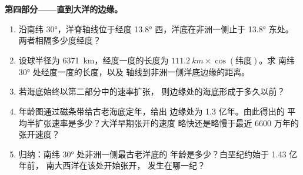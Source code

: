 \begin{problem}
\medskip
\noindent\textbf{第四部分——直到大洋的边缘。}
\begin{enumerate}[resume]
  \item 沿南纬 \ang{30}，洋脊轴线位于经度
        \ang{13.8} 西，洋底在非洲一侧止于
        \ang{13.8} 东处。两者相隔多少度经度？
  \item 设球半径为 \qty{6371}{km}，经度一度的长度为
        $\qty{111.2}{km} \times \cos(\text{纬度})$。求
        南纬 \ang{30} 处经度一度的长度，以及
        轴线到非洲一侧洋底边缘的距离。
  \item 若海底始终以第二部分中的速率扩张，
        则边缘处的海底形成于多久以前？
  \item 年龄图通过磁条带给古老海底定年，给出
        边缘处为 1.3 亿年。由此得出的
        平均半扩张速率是多少？大洋早期张开的速度
        略快还是略慢于最近 6600 万年的张开速度？
  \item 归纳：南纬 \ang{30} 处非洲一侧最古老洋底的
        年龄是多少？白垩纪约始于 1.43 亿年前，
        南大西洋在该处开始张开，
        发生在哪一纪？
\end{enumerate}
\end{problem}
